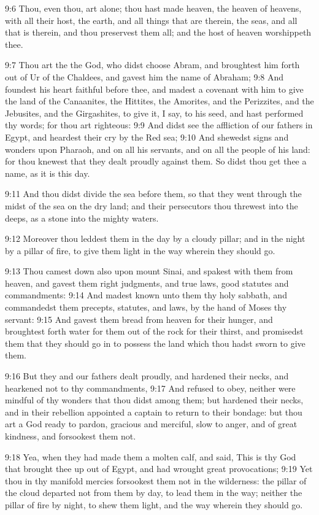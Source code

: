 9:6 Thou, even thou, art \LORD alone; thou hast made heaven, the heaven
of heavens, with all their host, the earth, and all things that are
therein, the seas, and all that is therein, and thou preservest them
all; and the host of heaven worshippeth thee.

9:7 Thou art the \LORD the God, who didst choose Abram, and broughtest
him forth out of Ur of the Chaldees, and gavest him the name of
Abraham; 9:8 And foundest his heart faithful before thee, and madest a
covenant with him to give the land of the Canaanites, the Hittites,
the Amorites, and the Perizzites, and the Jebusites, and the
Girgashites, to give it, I say, to his seed, and hast performed thy
words; for thou art righteous: 9:9 And didst see the affliction of our
fathers in Egypt, and heardest their cry by the Red sea; 9:10 And
shewedst signs and wonders upon Pharaoh, and on all his servants, and
on all the people of his land: for thou knewest that they dealt
proudly against them. So didst thou get thee a name, as it is this
day.

9:11 And thou didst divide the sea before them, so that they went
through the midst of the sea on the dry land; and their persecutors
thou threwest into the deeps, as a stone into the mighty waters.

9:12 Moreover thou leddest them in the day by a cloudy pillar; and in
the night by a pillar of fire, to give them light in the way wherein
they should go.

9:13 Thou camest down also upon mount Sinai, and spakest with them
from heaven, and gavest them right judgments, and true laws, good
statutes and commandments: 9:14 And madest known unto them thy holy
sabbath, and commandedst them precepts, statutes, and laws, by the
hand of Moses thy servant: 9:15 And gavest them bread from heaven for
their hunger, and broughtest forth water for them out of the rock for
their thirst, and promisedst them that they should go in to possess
the land which thou hadst sworn to give them.

9:16 But they and our fathers dealt proudly, and hardened their necks,
and hearkened not to thy commandments, 9:17 And refused to obey,
neither were mindful of thy wonders that thou didst among them; but
hardened their necks, and in their rebellion appointed a captain to
return to their bondage: but thou art a God ready to pardon, gracious
and merciful, slow to anger, and of great kindness, and forsookest
them not.

9:18 Yea, when they had made them a molten calf, and said, This is thy
God that brought thee up out of Egypt, and had wrought great
provocations; 9:19 Yet thou in thy manifold mercies forsookest them
not in the wilderness: the pillar of the cloud departed not from them
by day, to lead them in the way; neither the pillar of fire by night,
to shew them light, and the way wherein they should go.

